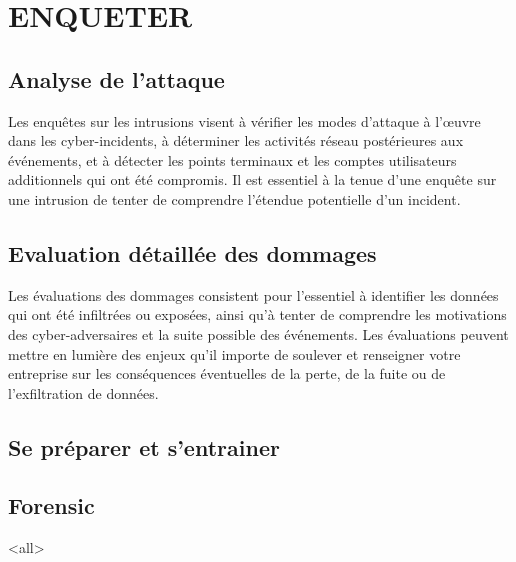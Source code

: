 %
%

\section{ENQUETER}
\subsection{Analyse de l'attaque}
Les enquêtes sur les intrusions visent à vérifier les modes d’attaque à l’œuvre dans les cyber-incidents, à déterminer
les activités réseau postérieures aux événements, et à détecter les points terminaux et les comptes utilisateurs additionnels qui ont été compromis. Il est essentiel à la tenue d’une enquête sur une intrusion de tenter de comprendre l’étendue potentielle d’un incident.

\subsection{Evaluation détaillée des dommages}

Les évaluations des dommages consistent pour l’essentiel à identifier les données qui ont été infiltrées ou exposées, ainsi qu’à tenter de comprendre les motivations des cyber-adversaires et la suite possible des événements. Les évaluations peuvent mettre en lumière des enjeux qu’il importe de soulever et renseigner votre entreprise sur les conséquences éventuelles de la perte, de la fuite ou de l’exfiltration de données.



\subsection{Se préparer et s'entrainer}


\subsection{Forensic}

\mode<all>{}

